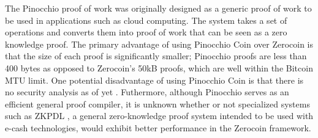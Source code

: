 The Pinocchio proof of work was originally designed as a generic proof of work to be used in applications such as cloud computing. The system takes a set of operations and converts them into proof of work that can be seen as a zero knowledge proof. The primary advantage of using Pinocchio Coin over Zerocoin is that the size of each proof is significantly smaller; Pinocchio proofs are less than 400 bytes as opposed to Zerocoin's 50kB proofs, which are well within the Bitcoin MTU limit. One potential disadvantage of using Pinocchio Coin is that there is no security analysis as of yet \cite{pinocchio}. Futhermore, although Pinocchio serves as an efficient general proof compiler, it is unknown whether or not specialized systems such as ZKPDL \cite{zkpdl}, a general zero-knowledge proof system intended to be used with e-cash technologies, would exhibit better performance in the Zerocoin framework.








